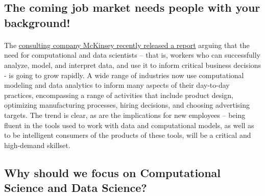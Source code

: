 \documentclass[%
oneside,                 %
final,                   %
10pt]{article}
\begin{document}
\subsection{The coming job market needs people with your background!}

\paragraph{}
The \href{{https://www.mckinsey.com/business-functions/mckinsey-analytics/our-insights/the-age-of-analytics-competing-in-a-data-driven-world}}{consulting company McKinsey recently released a report} arguing that the need for computational and data scientists – that is,
workers who can successfully analyze, model, and interpret data, and use it to inform critical business
decisions - is going to grow rapidly. A wide range of industries now use computational
modeling and data analytics to inform many aspects of their day-to-day practices, encompassing
a range of activities that include product design, optimizing manufacturing processes, hiring decisions,
and choosing advertising targets. The trend is clear, as are the implications for new employees
– being fluent in the tools used to work with data and computational models, as well as to be
intelligent consumers of the products of these tools, will be a critical and high-demand skillset.



\subsection{Why should we focus on Computational Science and Data Science?}

\end{document}

